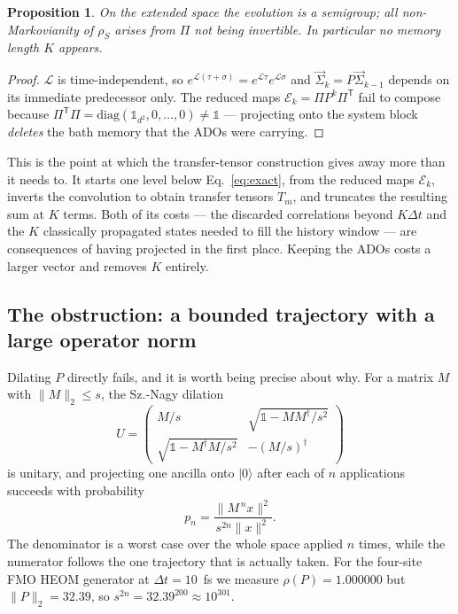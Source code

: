 \documentclass[aps,prx,twocolumn,superscriptaddress,nofootinbib,longbibliography]{revtex4-2}
\theoremstyle{plain}
\newtheorem{proposition}{Proposition}
\newcommand{\ket}[1]{|#1\rangle}
\newcommand{\adj}{^{\dagger}}
\newcommand{\norm}[1]{\lVert#1\rVert}
\begin{document}
\begin{proposition}
On the extended space the evolution is a semigroup; all non-Markovianity of
$\rho_S$ arises from $\Pi$ not being invertible.  In particular no memory length
$K$ appears.
\end{proposition}

\begin{proof}
$\mathcal L$ is time-independent, so
$e^{\mathcal L(\tau+\sigma)}=e^{\mathcal L\tau}e^{\mathcal L\sigma}$ and
$\vec\Sigma_k=P\vec\Sigma_{k-1}$ depends on its immediate predecessor only.  The
reduced maps $\mathcal E_k=\Pi P^k\Pi^{\mathsf T}$ fail to compose because
$\Pi^{\mathsf T}\Pi=\mathrm{diag}(\mathbb 1_{d^2},0,\dots,0)\neq\mathbb 1$ ---
projecting onto the system block \emph{deletes} the bath memory that the ADOs
were carrying.
\end{proof}

This is the point at which the transfer-tensor construction gives away more than
it needs to.  It starts one level below Eq.~\eqref{eq:exact}, from the reduced
maps $\mathcal E_k$, inverts the convolution to obtain transfer tensors $T_m$,
and truncates the resulting sum at $K$ terms.  Both of its costs --- the
discarded correlations beyond $K\Delta t$ and the $K$ classically propagated
states needed to fill the history window --- are consequences of having
projected in the first place.  Keeping the ADOs costs a larger vector and
removes $K$ entirely.

\subsection{The obstruction: a bounded trajectory with a large operator norm}

Dilating $P$ directly fails, and it is worth being precise about why.  For a
matrix $M$ with $\norm{M}_2\le s$, the Sz.-Nagy dilation
\begin{equation}
U=\begin{pmatrix}
M/s & \sqrt{\mathbb 1-MM\adj/s^2}\\
\sqrt{\mathbb 1-M\adj M/s^2} & -(M/s)\adj
\end{pmatrix}
\label{eq:sznagy}
\end{equation}
is unitary, and projecting one ancilla onto $\ket{0}$ after each of $n$
applications succeeds with probability
\begin{equation}
p_n=\frac{\norm{M^{\,n}x}^2}{s^{2n}\norm{x}^2}.
\label{eq:psucc}
\end{equation}
The denominator is a worst case over the whole space applied $n$ times, while
the numerator follows the one trajectory that is actually taken.  For the
four-site FMO HEOM generator at $\Delta t=10$~fs we measure
$\rho(P)=1.000000$ but $\norm{P}_2=32.39$, so $s^{2n}=32.39^{200}\approx10^{301}$.
\end{document}
